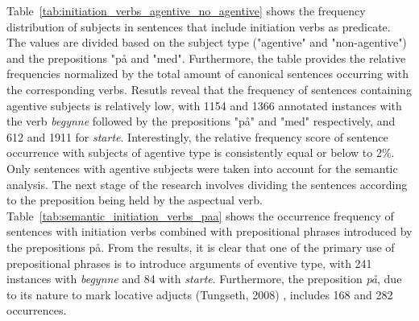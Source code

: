 \documentclass{article}
\begin{document}

Table~\ref{tab:initiation_verbs_agentive_no_agentive} shows the frequency distribution of subjects in sentences that include initiation verbs as predicate. The values are divided based on the subject type ("agentive" and "non-agentive") and the prepositions "på and "med". Furthermore, the table provides the relative frequencies normalized by the total amount of canonical sentences occurring with the corresponding verbs.
Resutls reveal that the frequency of sentences containing agentive subjects is relatively low, with 1154 and 1366 annotated instances with the verb \emph{begynne} followed by the prepositions "på" and "med" respectively, and 612 and 1911 for \emph{starte}. Interestingly, the relative frequency score of sentence occurrence with subjects of agentive type is consistently equal or below to 2\%. Only sentences with agentive subjects were taken into account for the semantic analysis.
The next stage of the research involves dividing the sentences according to the preposition being held by the aspectual verb. 
Table~\ref{tab:semantic_initiation_verbs_paa} shows the occurrence frequency of sentences with initiation verbs combined with prepositional phrases introduced by the prepositions på. From the results, it is clear that one of the primary use of prepositional phrases is to introduce arguments of eventive type, with 241 instances with \emph{begynne} and 84 with \emph{starte}. Furthermore, the preposition \emph{på}, due to its nature to mark locative adjucts (Tungseth, 2008)
, includes 168 and 282 occurrences. 
\end{document}

